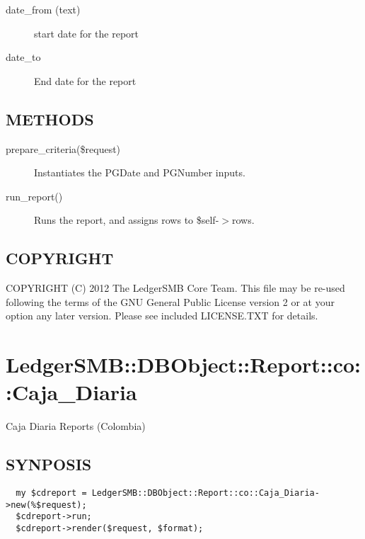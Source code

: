 \begin{description}
\begin{description}
\begin{description}
\begin{description}
\begin{description}
\begin{description}
\begin{description}
\begin{description}
\begin{description}
\begin{description}
\begin{description}
\item[{date\_from (text)}] \mbox{}

start date for the report


\item[{date\_to}] \mbox{}

End date for the report

\end{description}
\subsection*{METHODS\label{LedgerSMB::DBObject::Report::co::Balance_y_Mayor_METHODS}}
\begin{description}

\item[{prepare\_criteria(\$request)}] \mbox{}

Instantiates the PGDate and PGNumber inputs.


\item[{run\_report()}] \mbox{}

Runs the report, and assigns rows to \$self-$>$rows.

\end{description}
\subsection*{COPYRIGHT\label{LedgerSMB::DBObject::Report::co::Balance_y_Mayor_COPYRIGHT}}


COPYRIGHT (C) 2012 The LedgerSMB Core Team.  This file may be re-used following
the terms of the GNU General Public License version 2 or at your option any
later version.  Please see included LICENSE.TXT for details.

\section{LedgerSMB::DBObject::Report::co::Caja\_Diaria\label{LedgerSMB::DBObject::Report::co::Caja_Diaria}}


Caja Diaria Reports (Colombia)

\subsection*{SYNPOSIS\label{LedgerSMB::DBObject::Report::co::Caja_Diaria_SYNPOSIS}}
\begin{verbatim}
  my $cdreport = LedgerSMB::DBObject::Report::co::Caja_Diaria->new(%$request);
  $cdreport->run;
  $cdreport->render($request, $format);
\end{verbatim}

\end{description}
\end{description}
\end{description}
\end{description}
\end{description}
\end{description}
\end{description}
\end{description}
\end{description}
\end{description}
